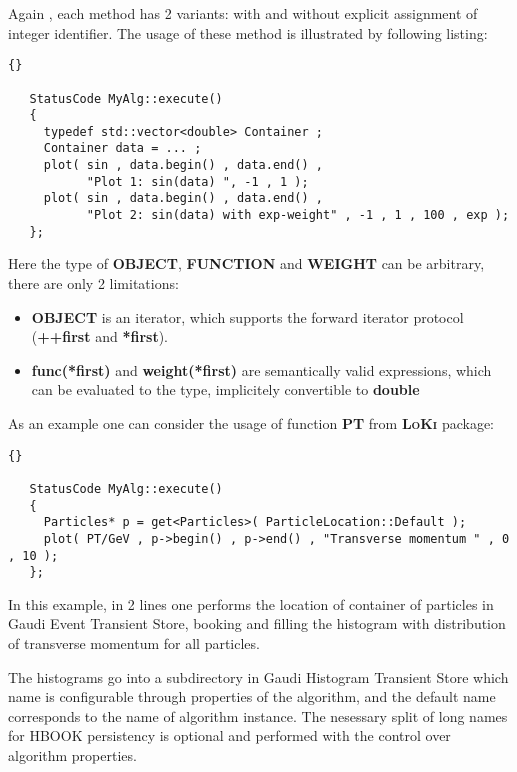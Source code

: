 \documentclass{lhcbnote}
\newcommand{\bftt}         {\ttfamily\bfseries}
\newcommand{\scbf}         {\scshape\bfseries}
\begin{document}
Again , each method has 2 variants: with and without explicit 
assignment of integer identifier.
The usage of these method is illustrated by following listing:

\begin{scriptsize}
 \begin{lstlisting}{}

   StatusCode MyAlg::execute()
   {
     typedef std::vector<double> Container ; 
     Container data = ... ;
     plot( sin , data.begin() , data.end() , 
           "Plot 1: sin(data) ", -1 , 1 ); 
     plot( sin , data.begin() , data.end() , 
           "Plot 2: sin(data) with exp-weight" , -1 , 1 , 100 , exp ); 
   }; 

 \end{lstlisting}
\end{scriptsize}

Here the type of {\bftt{OBJECT}}, {\bftt{FUNCTION}} and 
{\bftt{WEIGHT}} can be arbitrary, there are only 2 limitations:
\begin{itemize}
\item {\bftt{OBJECT}} is an iterator, which supports the forward iterator protocol
({\bftt{++first}} and {\bftt{*first}}).
\item {\bftt{func(*first)}} and {\bftt{weight(*first)}} are semantically  
  valid expressions, which can be evaluated to the type, implicitely 
  convertible to {\bftt{double}}
\end{itemize}  
As an example one can consider the usage of 
function {\bftt{PT}} from {\scbf{LoKi}} package:

\begin{scriptsize}
 \begin{lstlisting}{}

   StatusCode MyAlg::execute()
   {
     Particles* p = get<Particles>( ParticleLocation::Default );
     plot( PT/GeV , p->begin() , p->end() , "Transverse momentum " , 0  , 10 ); 
   }; 

 \end{lstlisting}
\end{scriptsize}

In this example, in 2 lines one performs the location of 
container of particles
in Gaudi Event Transient Store, booking and filling the histogram with 
distribution of transverse momentum  for all particles.


The histograms go into a subdirectory in Gaudi Histogram Transient 
Store which name is configurable through properties of the algorithm, 
and the default name corresponds to the name of algorithm instance. 
The nesessary split of long names for HBOOK persistency is 
optional and performed with the control over algorithm properties. 
\end{document}
